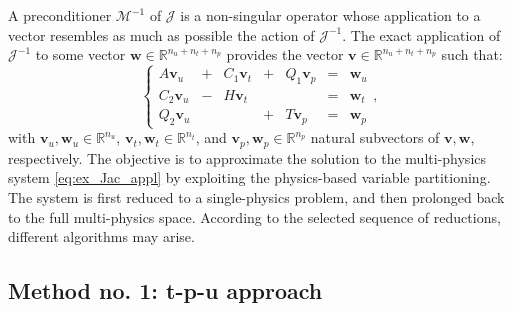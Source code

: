 \documentclass[3p,times]{elsarticle}
\theoremstyle{plain}
\begin{document}
A preconditioner $\mathcal{M}^{-1}$ of $\mathcal{J}$ is a non-singular operator whose application to a vector resembles as much as possible the action of $\mathcal{J}^{-1}$. The exact application of $\mathcal{J}^{-1}$ to some vector $\mathbf{w}\in\mathbb{R}^{n_u+n_t+n_p}$ provides the vector $\mathbf{v}\in\mathbb{R}^{n_u+n_t+n_p}$ such that:
\begin{equation}
    \left\{ \begin{array}{ccccccc}
    A\mathbf{v}_u &+& C_1\mathbf{v}_t &+& Q_1\mathbf{v}_p &=& \mathbf{w}_u \\
    C_2\mathbf{v}_u &-& H\mathbf{v}_t & & &=& \mathbf{w}_t \\
    Q_2\mathbf{v}_u & & &+& T\mathbf{v}_p &=& \mathbf{w}_p \end{array} \right. ,
    \label{eq:ex_Jac_appl}
\end{equation}
with $\mathbf{v}_u,\mathbf{w}_u\in\mathbb{R}^{n_u}$, $\mathbf{v}_t,\mathbf{w}_t\in\mathbb{R}^{n_t}$, and $\mathbf{v}_p,\mathbf{w}_p\in\mathbb{R}^{n_p}$ natural subvectors of $\mathbf{v},\mathbf{w}$, respectively. The objective is to approximate the solution to the multi-physics system \eqref{eq:ex_Jac_appl} by exploiting the physics-based variable partitioning. The system is first reduced to a single-physics problem, and then prolonged back to the full multi-physics space. According to the selected sequence of reductions, different algorithms may arise. 

\subsection{Method no. 1: t-p-u approach}
\end{document}
